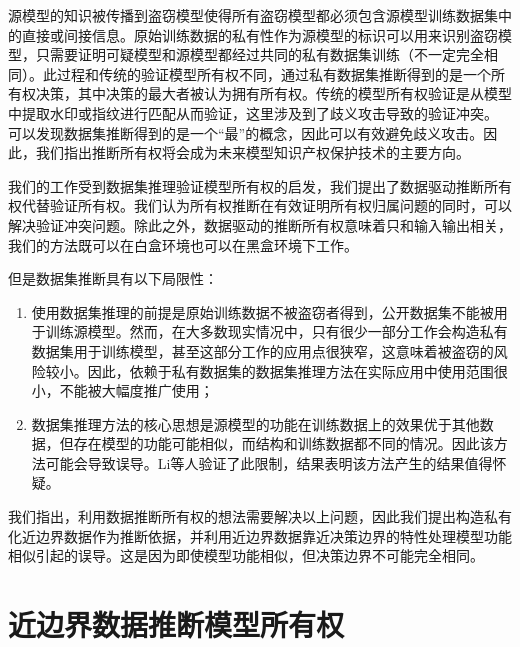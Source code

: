 源模型的知识被传播到盗窃模型使得所有盗窃模型都必须包含源模型训练数据集中的直接或间接信息。原始训练数据的私有性作为源模型的标识可以用来识别盗窃模型，只需要证明可疑模型和源模型都经过共同的私有数据集训练（不一定完全相同）。此过程和传统的验证模型所有权不同，通过私有数据集推断得到的是一个所有权决策，其中决策的最大者被认为拥有所有权。传统的模型所有权验证是从模型中提取水印或指纹进行匹配从而验证，这里涉及到了歧义攻击导致的验证冲突。 可以发现数据集推断得到的是一个“最”的概念，因此可以有效避免歧义攻击。因此，我们指出推断所有权将会成为未来模型知识产权保护技术的主要方向。

我们的工作受到数据集推理验证模型所有权的启发，我们提出了数据驱动推断所有权代替验证所有权。我们认为所有权推断在有效证明所有权归属问题的同时，可以解决验证冲突问题。除此之外，数据驱动的推断所有权意味着只和输入输出相关，我们的方法既可以在白盒环境也可以在黑盒环境下工作。

但是数据集推断具有以下局限性：
\begin{enumerate}
	\renewcommand{\labelenumi}{\theenumi)}
	\item 使用数据集推理的前提是原始训练数据不被盗窃者得到，公开数据集不能被用于训练源模型。然而，在大多数现实情况中，只有很少一部分工作会构造私有数据集用于训练模型，甚至这部分工作的应用点很狭窄，这意味着被盗窃的风险较小。因此，依赖于私有数据集的数据集推理方法在实际应用中使用范围很小，不能被大幅度推广使用；
	\item 数据集推理方法的核心思想是源模型的功能在训练数据上的效果优于其他数据，但存在模型的功能可能相似，而结构和训练数据都不同的情况。因此该方法可能会导致误导。Li\cite{lao2022deepauth}等人验证了此限制，结果表明该方法产生的结果值得怀疑。
\end{enumerate}

我们指出，利用数据推断所有权的想法需要解决以上问题，因此我们提出构造私有化近边界数据作为推断依据，并利用近边界数据靠近决策边界的特性处理模型功能相似引起的误导。这是因为即使模型功能相似，但决策边界不可能完全相同。

\section{近边界数据推断模型所有权}

